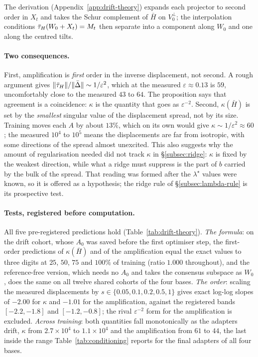 The derivation (Appendix~\ref{app:drift-theory}) expands each projector to
second order in $X_t$ and takes the Schur complement of $\bar H$ on
$V_0^\perp$; the interpolation conditions $\bar{\tau}_H(W_0 + X_t) = M_t$ then
separate into a component along $W_0$ and one along the centred tilts.

\paragraph{Two consequences.} First, amplification is \emph{first} order in
the inverse displacement, not second. A rough argument gives
$\|\bar{\tau}_H\|/\|\bar\Delta\| \sim 1/\varepsilon^{2}$, which at the measured
$\varepsilon \approx 0.13$ is $59$, uncomfortably close to the measured $43$
to $64$. The proposition says that agreement is a coincidence: $\kappa$ is the
quantity that goes as $\varepsilon^{-2}$. Second, $\kappa(\bar H)$ is set by
the \emph{smallest} singular value of the displacement spread, not by its size.
Training moves each $A$ by about $13\%$, which on its own would give
$\kappa \sim 1/\varepsilon^2 \approx 60$; the measured $10^{4}$ to $10^{5}$
means the displacements are far from isotropic, with some directions of the
spread almost unexcited. This also suggests why the amount of regularisation
needed did not track $\kappa$ in \S\ref{subsec:ridge}: $\kappa$ is fixed by
the weakest direction, while what a ridge must suppress is the part of $b$
carried by the bulk of the spread. That reading was formed after the
$\lambda^\star$ values were known, so it is offered as a hypothesis; the
ridge rule of \S\ref{subsec:lambda-rule} is its prospective test.

\paragraph{Tests, registered before computation.} All five pre-registered
predictions hold (Table~\ref{tab:drift-theory}).
\emph{The formula}: on the drift cohort, whose $A_0$ was saved before the first
optimiser step, the first-order predictions of $\kappa(\bar H)$ and of the
amplification equal the exact values to three digits at $25$, $50$, $75$ and
$100\%$ of training (ratio $1.000$ throughout), and the reference-free
version, which needs no $A_0$ and takes the consensus subspace as $W_0$, does
the same on all twelve shared cohorts of the four bases.
\emph{The order}: scaling the measured displacements by
$s \in \{0.05, 0.1, 0.2, 0.5, 1\}$ gives exact log-log slopes of $-2.00$ for
$\kappa$ and $-1.01$ for the amplification, against the registered bands
$[-2.2, -1.8]$ and $[-1.2, -0.8]$; the rival $\varepsilon^{-2}$ form for the
amplification is excluded.
\emph{Across training}: both quantities fall monotonically as the adapters
drift, $\kappa$ from $2.7\times10^{4}$ to $1.1\times10^{4}$ and the
amplification from $61$ to $44$, the last inside the range
Table~\ref{tab:conditioning} reports for the final adapters of all four bases.

